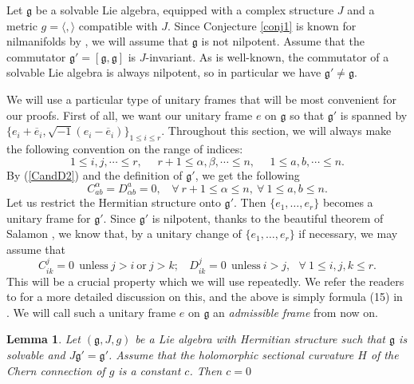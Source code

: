 \documentclass{amsart}
\newtheorem{lemma}{Lemma}
\begin{document}
Let ${\mathfrak g}$ be  a solvable Lie algebra, equipped with a complex structure $J$ and a  metric $g=\langle ,\rangle$ compatible with $J$. Since Conjecture \ref{conj1} is known for nilmanifolds by \cite{LZ}, we will assume that ${\mathfrak g}$ is not nilpotent. Assume that the commutator ${\mathfrak g}'=[{\mathfrak g},{\mathfrak g}]$ is $J$-invariant. As is well-known, the commutator of a solvable Lie algebra is always nilpotent, so in particular we have  ${\mathfrak g}'\neq {\mathfrak g}$. 

We will use a particular type of unitary frames that will be most convenient for our proofs. First of all, we want our unitary frame $e$  on ${\mathfrak g}$ so that ${\mathfrak g}'$ is spanned by $\{ e_i+\overline{e}_i, \sqrt{-1}(e_i - \overline{e}_i)\}_{1\leq i\leq r}$. Throughout this section, we will always make the following convention on the range of indices:
$$ 1\leq i,j,\cdots \leq r, \ \ \ \ \ \ r\!+\!1\leq \alpha, \beta , \cdots \leq n, \ \ \ \ \ \ 1\leq a,b,\cdots \leq n. $$
By (\ref{CandD2}) and the definition of ${\mathfrak g}'$, we get the following
\begin{equation}  \label{eq:res1}
C^{\alpha}_{ab}=D^{a}_{\alpha b}=0, \ \ \ \ \forall \ r\!+\!1\leq \alpha \leq n, \ \forall \ 1\leq a,b\leq n. 
\end{equation}
Let us restrict the Hermitian structure onto ${\mathfrak g}'$. Then $\{  e_1, \ldots , e_r\}$ becomes a unitary frame for  ${\mathfrak g}'$. Since ${\mathfrak g}'$ is nilpotent, thanks to the beautiful theorem of Salamon \cite[Theorem 1.3]{Salamon}, we know that, by a unitary change of $\{ e_1, \ldots , e_r\}$ if necessary, we may assume that
\begin{equation}  \label{eq:res2}
C^j_{ik}=0  \ \  \mbox{unless} \ j>i \ \mbox{or} \ j>k; \ \ \ \ D^j_{ik}=0 \  \ \mbox{unless} \ i>j, \ \ \ \forall \ 1\leq i,j,k\leq r.
\end{equation}
This will be a crucial property which we will use repeatedly. We refer the readers to \cite{LZ} for a more detailed discussion on this, and the above is simply formula (15) in \cite{LZ}. We will call such a unitary frame $e$ on ${\mathfrak g}$  an {\em admissible frame} from now on.

\begin{lemma} \label{lemmac=0}
Let $({\mathfrak g},J,g)$ be a Lie algebra with Hermitian structure such that ${\mathfrak g}$ is solvable and  $J{\mathfrak g}'={\mathfrak g}'$. Assume that the holomorphic sectional curvature $H$ of the Chern connection of $g$ is a constant $c$. Then $c=0$
\end{lemma}
\end{document}
